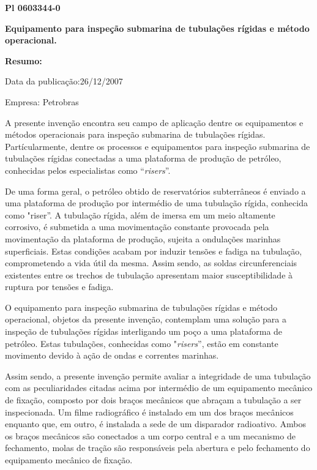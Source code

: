 \documentclass[a4paper,12pt]{article}
\begin{document}
\vspace{1,0cm}
 \begin{center}
  \textbf{Pl 0603344-0} 
 
 \textbf{Equipamento para inspeção submarina de tubulações rígidas e método operacional.}
 \end{center}
 
 \textbf{Resumo:}
 
 Data da publicação:26/12/2007
 
 Empresa: Petrobras
 
 \vspace{1,0cm}

A presente invenção encontra seu campo de aplicação dentre os
equipamentos e métodos operacionais para inspeção submarina de
tubulações rígidas. Partícularmente, dentre os processos e equipamentos
para inspeção submarina de tubulações rígidas conectadas a uma
plataforma de produção de petróleo, conhecidas pelos especialistas como
“\textit{risers}”.

De uma forma geral, o petróleo obtido de reservatórios subterrâneos
é enviado a uma plataforma de produção por intermédio de uma tubulação
rígida, conhecida como "riser”. A tubulação rígida, além de imersa em um
meio altamente corrosivo, é submetida a uma movimentação constante
provocada pela movimentação da plataforma de produção, sujeita a
ondulações marinhas superficiais. Estas condições acabam por induzir
tensões e fadiga na tubulação, comprometendo a vida útil da mesma. Assim sendo, as soldas circunferenciais existentes entre os trechos
de tubulação apresentam maior susceptibilidade à ruptura por tensões e fadiga.

O equipamento para inspeção submarina de tubulações rígidas e
método operacional, objetos da presente invenção, contemplam uma
solução para a inspeção de tubulações rígidas interligando um poço a uma
plataforma de petróleo. Estas tubulações, conhecidas como "\textit{risers}”, estão
em constante movimento devido à ação de ondas e correntes marinhas.

Assim sendo, a presente invenção permite avaliar a integridade de
uma tubulação com as peculiaridades citadas acima por intermédio de um
equipamento mecânico de fixação, composto por dois braços mecânicos
que abraçam a tubulação a ser inspecionada. Um filme radiográfico é
instalado em um dos braços mecânicos enquanto que, em outro, é instalada
a sede de um disparador radioativo. Ambos os braços mecânicos são
conectados a um corpo central e a um mecanismo de fechamento, molas de
tração são responsáveis pela abertura e pelo fechamento do equipamento
mecânico de fixação.
\end{document}
